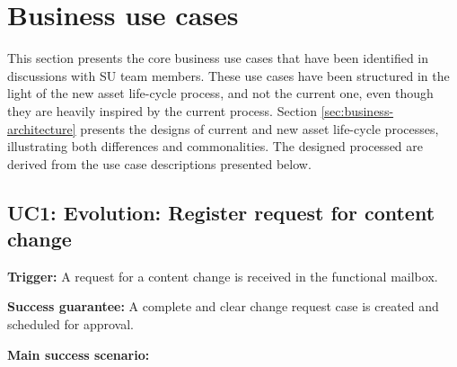 \section{Business use cases}
\label{sec:business-use cases}
	
	This section presents the core business use cases that have been identified in discussions with SU team members. These use cases have been structured in the light of the new asset life-cycle process, and not the current one, even though they are heavily inspired by the current process. Section \ref{sec:business-architecture} presents the designs of current and new asset life-cycle processes, illustrating both differences and commonalities. The designed processed are derived from the use case descriptions presented below. 
	
	\subsection{UC1: Evolution: Register request for content change}
	\label{sec:uc1}
	
	\textbf{Trigger:} A request for a content change is received in the functional mailbox.
	
	\textbf{Success guarantee:} A complete and clear change request case is created and scheduled for approval.
	
	\textbf{Main success scenario:}
	
